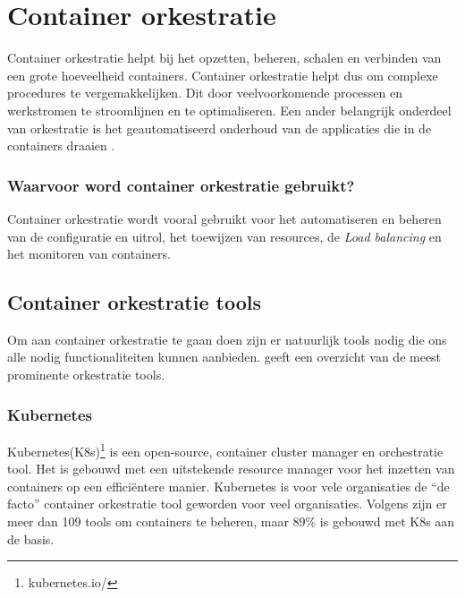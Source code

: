 \section{Container orkestratie}
Container orkestratie helpt bij het opzetten, beheren, schalen en verbinden van een grote hoeveelheid containers. Container orkestratie helpt dus om complexe procedures te vergemakkelijken. Dit door veelvoorkomende processen en werkstromen te stroomlijnen en te optimaliseren. Een ander belangrijk onderdeel van orkestratie is het geautomatiseerd onderhoud van de applicaties die in de containers draaien \autocite{RedHat2021}.

\subsubsection{Waarvoor word container orkestratie gebruikt?}

Container orkestratie wordt vooral gebruikt voor het automatiseren en beheren van de configuratie en uitrol, het toewijzen van resources, de \textit{Load balancing} en het monitoren van containers.

\subsection{Container orkestratie tools}
Om aan container orkestratie te gaan doen zijn er natuurlijk tools nodig die ons alle nodig functionaliteiten kunnen aanbieden. \textcite{DevopsCube2021} geeft een overzicht van de meest prominente orkestratie tools.

\subsubsection{Kubernetes}
Kubernetes(K8s)\footnote{kubernetes.io/} is een open-source, container cluster manager en orchestratie tool. Het is gebouwd met een uitstekende resource manager voor het inzetten van containers op een efficiëntere manier. Kubernetes is voor vele organisaties de ``de facto'' container orkestratie tool geworden voor veel organisaties. Volgens \textcite{CNCF2021} zijn er meer dan 109 tools om containers te beheren, maar 89\% is gebouwd met K8s aan de basis.


